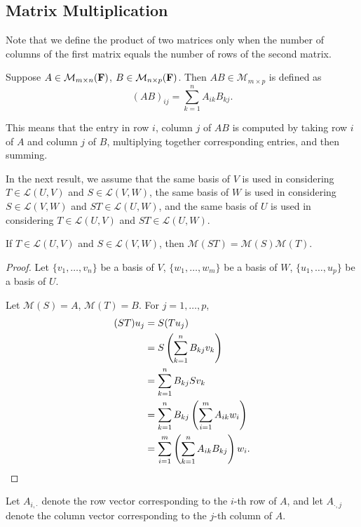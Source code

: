 \subsection{Matrix Multiplication}
Note that we define the product of two matrices only when the number of columns of the first matrix equals the number of rows of the second matrix.

\begin{definition}
Suppose $A\in\mathcal{M}_{m\times n}(\mathbf F)$, $B\in\mathcal{M}_{n\times p}(\mathbf F)$. Then $AB\in\mathcal{M}_{m\times p}$ is defined as
\[(AB)_{ij}=\sum_{k=1}^{n}A_{ik}B_{kj}.\]
\end{definition}

This means that the entry in row $i$, column $j$ of $AB$ is computed by taking row $i$ of $A$ and column $j$ of $B$, multiplying together corresponding entries, and then summing.

In the next result, we assume that the same basis of $V$ is used in considering $T\in\mathcal{L}(U,V)$ and $S\in\mathcal{L}(V,W)$, the same basis of $W$ is used in considering $S\in\mathcal{L}(V,W)$ and $ST\in\mathcal{L}(U,W)$, and the same basis of $U$ is used in considering $T\in\mathcal{L}(U,V)$ and $ST\in\mathcal{L}(U,W)$.

\begin{lemma}
If $T\in\mathcal{L}(U,V)$ and $S\in\mathcal{L}(V,W)$, then $\mathcal{M}(ST)=\mathcal{M}(S)\mathcal{M}(T)$.
\end{lemma}

\begin{proof}
Let $\{v_1,\dots,v_n\}$ be a basis of $V$, $\{w_1,\dots,w_m\}$ be a basis of $W$, $\{u_1,\dots,u_p\}$ be a basis of $U$.

Let $\mathcal{M}(S)=A$, $\mathcal{M}(T)=B$. For $j=1,\dots,p$,
\begin{align*}
(ST)u_j&=S(Tu_j)\\
&=S\left(\sum_{k=1}^{n}B_{kj}v_k\right)\\
&=\sum_{k=1}^{n}B_{kj}Sv_k\\
&=\sum_{k=1}^{n}B_{kj}\left(\sum_{i=1}^{m}A_{ik}w_i\right)\\
&=\sum_{i=1}^{m}\left(\sum_{k=1}^{n}A_{ik}B_{kj}\right)w_i.
\end{align*}
\end{proof}

\begin{notation}
Let $A_{i,\cdot}$ denote the row vector corresponding to the $i$-th row of $A$, and let $A_{\cdot,j}$ denote the column vector corresponding to the $j$-th column of $A$.
\end{notation}

